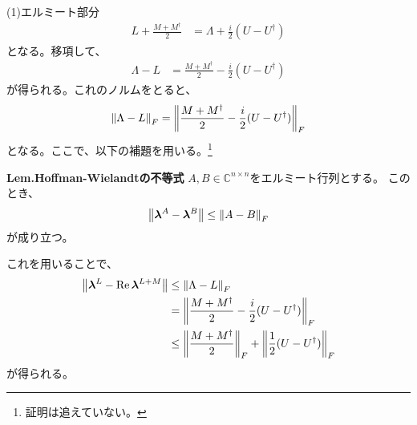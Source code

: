 \documentclass[a4paper,11pt]{jsarticle}
\numberwithin{equation}{section}
\begin{document}
(1)エルミート部分\\
\begin{align}
    L + \frac{M + M^{\dagger}}{2} &= \Lambda + \frac{i}{2}(U-U^{\dagger})
\end{align}
となる。移項して、
\begin{align}
    \Lambda - L &= \frac{M + M^{\dagger}}{2} - \frac{i}{2}(U-U^{\dagger})
\end{align}
が得られる。これのノルムをとると、
\begin{align}
    \norm{\Lambda - L}_F= \norm{\frac{M + M^{\dagger}}{2} - \frac{i}{2}(U-U^{\dagger})}_F
\end{align}
となる。ここで、以下の補題を用いる。\footnote{証明は追えていない。}
\begin{itembox}[l]{\textbf{Lem.Hoffman-Wielandtの不等式}}
    $A, B \in \mathbb{C}^{n \times n}$をエルミート行列とする。
    このとき、
    \begin{align}
        \norm{\bm{\lambda}^A - \bm{\lambda}^B} \leq \norm{A-B}_F
    \end{align}
    が成り立つ。
\end{itembox}
これを用いることで、
\begin{align}
    \norm{\bm{\lambda}^L - \Re \bm{\lambda}^{L + M}} &\leq \norm{\Lambda - L}_F\\
    &= \norm{\frac{M + M^{\dagger}}{2} - \frac{i}{2}(U-U^{\dagger})}_F\\
    &\leq \norm{\frac{M + M^{\dagger}}{2}}_F + \norm{\frac{1}{2}(U-U^{\dagger})}_F
\end{align}
が得られる。\\
\end{document}
